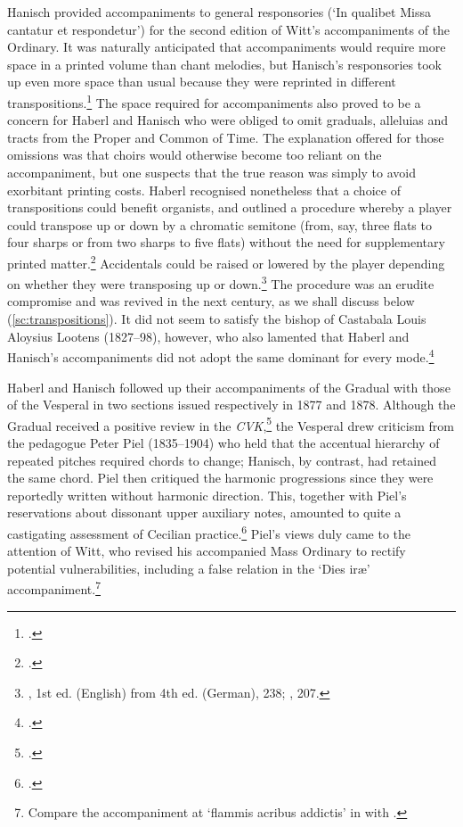 Hanisch provided accompaniments to general responsories (`In qualibet Missa cantatur et respondetur') for the second edition of Witt's accompaniments of the Ordinary.
It was naturally anticipated that accompaniments would require more space in a printed volume than chant melodies, but Hanisch's responsories took up even more space than usual because they were reprinted in different transpositions.\footcites[p.~70*]{Gradualetemporesanctis1871}[106--107]{WittOrganumcomitansad1876}
The space required for accompaniments also proved to be a concern for Haberl and Hanisch who were obliged to omit graduals, alleluias and tracts from the Proper and Common of Time.
The explanation offered for those omissions was that choirs would otherwise become too reliant on the accompaniment, but one suspects that the true reason was simply to avoid exorbitant printing costs.
%
Haberl recognised nonetheless that a choice of transpositions could benefit organists, and outlined a procedure whereby a player could transpose up or down by a chromatic semitone (from, say, three flats to four sharps or from two sharps to five flats) without the need for supplementary printed matter.\footcite[p.~iv]{HaberlOrganumcomitansad1875}
Accidentals could be raised or lowered by the player depending on whether they were transposing up or down.\footnote{\cite{HaberlMagisterChoralisTheoretical1877}, 1st ed. (English) from 4th ed. (German), 238; \cite{HaberlMagisterChoralisTheoretical1892}, 207.}
The procedure was an erudite compromise and was revived in the next century, as we shall discuss below (\cref{sc:transpositions}).
%
It did not seem to satisfy the bishop of Castabala Louis Aloysius Lootens (1827--98), however, who also lamented that Haberl and Hanisch's accompaniments did not adopt the same dominant for every mode.\footcite[p.~403 n.~1]{Lootenstheoriemusicalechant1895}


Haberl and Hanisch followed up their accompaniments of the Gradual with those of the Vesperal in two sections issued respectively in 1877 and 1878.
Although the Gradual received a positive review in the \emph{CVK},\footnote{.} the Vesperal drew criticism from the pedagogue Peter Piel (1835--1904) who held that the accentual hierarchy of repeated pitches required chords to change; Hanisch, by contrast, had retained the same chord.
Piel then critiqued the harmonic progressions since they were reportedly written without harmonic direction.
This, together with Piel's reservations about dissonant upper auxiliary notes, amounted to quite a castigating assessment of Cecilian practice.\footnote{.}
Piel's views duly came to the attention of Witt, who revised his accompanied Mass Ordinary to rectify potential vulnerabilities, including a false relation in the `Dies iræ' accompaniment.\footnote{Compare the accompaniment at `flammis acribus addictis' in \cite[2nd ed., p.~90]{WittOrganumcomitansad1876} with \cite[3rd ed., p.~90]{WittOrganumcomitansad1881}.}


